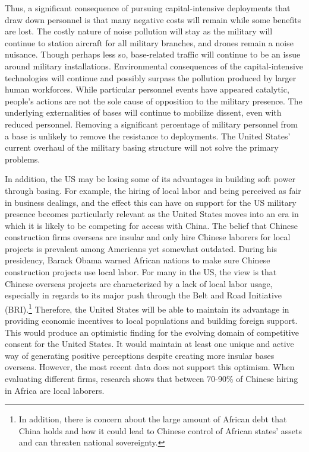 Thus, a significant consequence of pursuing capital-intensive deployments that draw down personnel is that many negative costs will remain while some benefits are lost. The costly nature of noise pollution will stay as the military will continue to station aircraft for all military branches, and drones remain a noise nuisance.\cite{Schaffer2021} Though perhaps less so, base-related traffic will continue to be an issue around military installations. Environmental consequences of the capital-intensive technologies will continue and possibly surpass the pollution produced by larger human workforces. While particular personnel events have appeared catalytic, people's actions are not the sole cause of opposition to the military presence. The underlying externalities of bases will continue to mobilize dissent, even with reduced personnel. Removing a significant percentage of military personnel from a base is unlikely to remove the resistance to deployments. The United States' current overhaul of the military basing structure will not solve the primary problems.


In addition, the US may be losing some of its advantages in building soft power through basing. For example, the hiring of local labor and being perceived as fair in business dealings, and the effect this can have on support for the US military presence becomes particularly relevant as the United States moves into an era in which it is likely to be competing for access with China. The belief that Chinese construction firms overseas are insular and only hire Chinese laborers for local projects is prevalent among Americans yet somewhat outdated. During his presidency, Barack Obama warned African nations to make sure Chinese construction projects use local labor.\cite{economist2014}  For many in the US, the view is that Chinese overseas projects are characterized by a lack of local labor usage, especially in regards to its major push through the Belt and Road Initiative (BRI).\footnote{In addition, there is concern about the large amount of African debt that China holds and how it could lead to Chinese control of African states' assets and can threaten national sovereignty.\cite{Gavin2021}} Therefore, the United States will be able to maintain its advantage in providing economic incentives to local populations and building foreign support. This would produce an optimistic finding for the evolving domain of competitive consent for the United States. It would maintain at least one unique and active way of generating positive perceptions despite creating more insular bases overseas. However, the most recent data does not support this optimism.  When evaluating different firms, research shows that between 70-90\% of Chinese hiring in Africa are local laborers.\cite{Chiyemura2021} 

